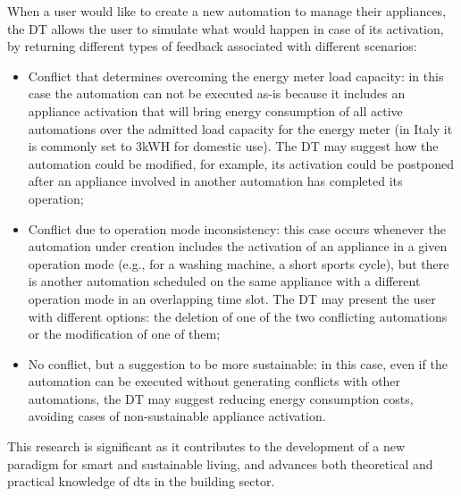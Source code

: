 When a user would like to create a new automation
to manage their appliances, the DT allows the user to simulate what
would happen in case of its activation, by returning different types
of feedback associated with different scenarios:

\begin{itemize}
    \item  Conflict that determines overcoming the energy meter load capacity: in this case the automation can not be executed as-is because it includes an appliance activation that will bring energy consumption of all active automations over the admitted load capacity for the energy meter (in Italy it is commonly set to 3kWH for domestic use). The DT may suggest how the automation could be modified, for example, its activation could be postponed after an appliance involved in another automation has completed its operation;
    \item Conflict due to operation mode inconsistency: this case occurs whenever the automation under creation includes the activation of an appliance in a given operation mode (e.g., for a washing machine, a short sports cycle), but there is another automation scheduled on the same appliance with a different operation mode in an overlapping time slot. The DT may present the user with different options: the deletion of one of the two conflicting automations or the modification of one of them;
    \item No conflict, but a suggestion to be more sustainable: in this case, even if the automation can be executed without generating conflicts with other automations, the DT may suggest reducing energy consumption costs, avoiding cases of non-sustainable appliance activation.
\end{itemize}

This research is significant as it contributes to the development of a new paradigm for smart and sustainable living, and advances both theoretical and practical knowledge of \acrshort{dt}s in the building sector.